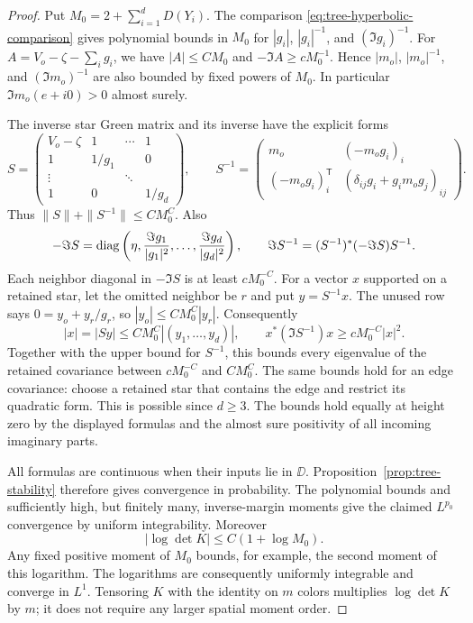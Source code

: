 \begin{proof}
Put $M_0=2+\sum_{i=1}^dD(Y_i)$.  The comparison
\eqref{eq:tree-hyperbolic-comparison} gives polynomial bounds in
$M_0$ for $|g_i|$, $|g_i|^{-1}$, and $(\Im g_i)^{-1}$.
For $A=V_o-\zeta-\sum_i g_i$, we have $|A|\le CM_0$ and
$-\Im A\ge cM_0^{-1}$.  Hence $|m_o|$, $|m_o|^{-1}$, and
$(\Im m_o)^{-1}$ are also bounded by fixed powers of $M_0$.
In particular $\Im m_o(e+i0)>0$ almost surely.

The inverse star Green matrix and its inverse have the explicit forms
\begin{equation}\label{eq:tree-star-matrix}
 S=\begin{pmatrix}
 V_o-\zeta&1&\cdots&1\\
 1&1/g_1&&0\\
 \vdots&&\ddots&\\
 1&0&&1/g_d
 \end{pmatrix},\qquad
 S^{-1}=\begin{pmatrix}
 m_o&(-m_og_i)_i\\
 (-m_og_i)_i^{\mathsf T}&(\delta_{ij}g_i+g_im_og_j)_{ij}
 \end{pmatrix}.
\end{equation}
Thus $\|S\|+\|S^{-1}\|\le CM_0^C$.  Also
\[
 -\Im S=\operatorname{diag}\left(\eta,
       \frac{\Im g_1}{|g_1|^2},\ldots,
       \frac{\Im g_d}{|g_d|^2}\right),
 \qquad
 \Im S^{-1}=(S^{-1})^*(-\Im S)S^{-1}.
\]
Each neighbor diagonal in $-\Im S$ is at least $cM_0^{-C}$.
For a vector $x$ supported on a retained star, let the omitted
neighbor be $r$ and put $y=S^{-1}x$.  The unused row says
$0=y_o+y_r/g_r$, so $|y_o|\le CM_0^C|y_r|$.
Consequently
\[
 |x|=|Sy|\le CM_0^C|(y_1,\ldots,y_d)|,
 \qquad
 x^*(\Im S^{-1})x\ge cM_0^{-C}|x|^2.
\]
Together with the upper bound for $S^{-1}$, this bounds every
eigenvalue of the retained covariance between $cM_0^{-C}$ and
$CM_0^C$.  The same bounds hold for an edge covariance: choose a
retained star that contains the edge and restrict its quadratic
form.  This is possible since $d\ge3$.  The bounds hold equally
at height zero by the displayed formulas and the almost sure
positivity of all incoming imaginary parts.

All formulas are continuous when their inputs lie in $\DD$.
Proposition~\ref{prop:tree-stability} therefore gives convergence in
probability.  The polynomial bounds and sufficiently high, but
finitely many, inverse-margin moments give the claimed $L^{p_0}$
convergence by uniform integrability.  Moreover
\[
 |\log\det K|\le C(1+\log M_0).
\]
Any fixed positive moment of $M_0$ bounds, for example, the second
moment of this logarithm.  The logarithms are consequently uniformly
integrable and converge in $L^1$.  Tensoring $K$ with the identity
on $m$ colors multiplies $\log\det K$ by $m$; it does not require
any larger spatial moment order.
\end{proof}

